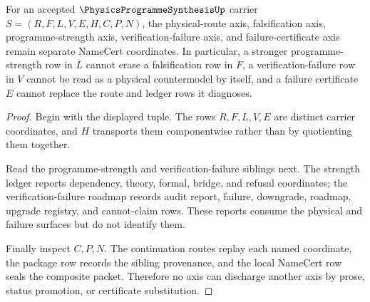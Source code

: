 \begin{theorem}
\label{thm:physics-programme-synthesis-axis-separation}
For an accepted $\PhysicsProgrammeSynthesisUp$ carrier $S=(R,F,L,V,E,H,C,P,N)$, the physical-route axis, falsification axis, programme-strength axis, verification-failure axis, and failure-certificate axis remain separate NameCert coordinates. In particular, a stronger programme-strength row in $L$ cannot erase a falsification row in $F$, a verification-failure row in $V$ cannot be read as a physical countermodel by itself, and a failure certificate $E$ cannot replace the route and ledger rows it diagnoses.
\end{theorem}
\begin{proof}
Begin with the displayed tuple. The rows $R,F,L,V,E$ are distinct carrier coordinates, and $H$ transports them componentwise rather than by quotienting them together.

Read the programme-strength and verification-failure siblings next. The strength ledger reports dependency, theory, formal, bridge, and refusal coordinates; the verification-failure roadmap records audit report, failure, downgrade, roadmap, upgrade registry, and cannot-claim rows. These reports consume the physical and failure surfaces but do not identify them.

Finally inspect $C,P,N$. The continuation routes replay each named coordinate, the package row records the sibling provenance, and the local NameCert row seals the composite packet. Therefore no axis can discharge another axis by prose, status promotion, or certificate substitution.
\end{proof}



